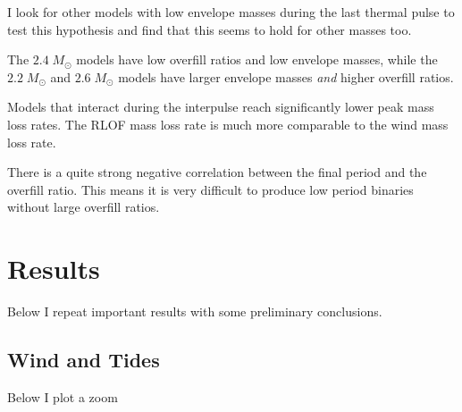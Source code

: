 \documentclass[a4paper,10pt]{article}
\begin{document}
\begin{enumerate}
	      I look for other models with low envelope masses during the last thermal pulse to test
	      this hypothesis and find that this seems to hold for other masses too.

	      The \(2.4\; M_\odot \) models have low overfill ratios and low envelope masses,
	      while the \(2.2\; M_\odot \) and \(2.6\; M_\odot \) models have larger envelope masses
	      \emph{and} higher overfill ratios.

	      Models that interact during the interpulse reach significantly lower peak mass loss
	      rates.
	      The RLOF mass loss rate is much more comparable to the wind mass loss rate.

	      There is a quite strong negative correlation between the final period and the overfill ratio.
	      This means it is very difficult to produce low period binaries without
	      large overfill ratios.
\end{enumerate}
\section{Results}

Below I repeat important results with some preliminary conclusions.

\subsection{Wind and Tides}

\begin{figure}[ht]
	\centering
\end{figure}

\begin{figure}[ht]
	\centering
\end{figure}
Below I plot a zoom
\begin{figure}[ht]
	\centering
\end{figure}
\end{document}
